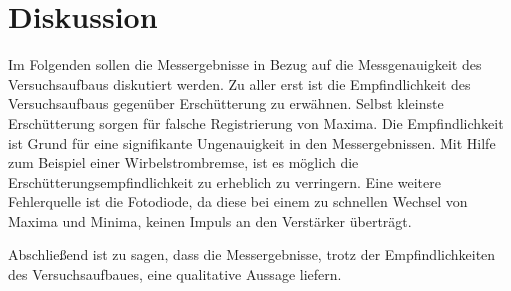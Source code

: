 \section{Diskussion}
Im Folgenden sollen die Messergebnisse in Bezug auf die Messgenauigkeit des
Versuchsaufbaus diskutiert werden.
Zu aller erst ist die Empfindlichkeit des Versuchsaufbaus gegenüber Erschütterung %
zu erwähnen. Selbst kleinste Erschütterung sorgen für falsche Registrierung von %
Maxima. Die Empfindlichkeit ist Grund für eine signifikante Ungenauigkeit in den
Messergebnissen. Mit Hilfe zum Beispiel einer Wirbelstrombremse, ist es möglich die %
Erschütterungsempfindlichkeit zu erheblich zu verringern. %
Eine weitere Fehlerquelle ist die Fotodiode, da diese bei einem zu schnellen
Wechsel von Maxima und Minima, keinen Impuls an den Verstärker überträgt.

Abschließend ist zu sagen, dass die Messergebnisse, trotz der Empfindlichkeiten
des Versuchsaufbaues, eine qualitative Aussage liefern.


